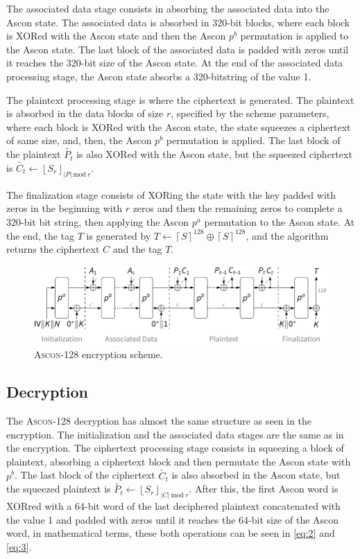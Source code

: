 \documentclass[11pt,twoside]{article}
\begin{document}
The associated data stage consists in absorbing the associated data into the Ascon state. The associated data is absorbed in 320-bit blocks, where each block is XORed with the Ascon state and then the Ascon $p^b$ permutation is applied to the Ascon state. The last block of the associated data is padded with zeros until it reaches the 320-bit size of the Ascon state. At the end of the associated data processing stage, the Ascon state absorbs a 320-bitstring of the value 1.

The plaintext processing stage is where the ciphertext is generated. The plaintext is absorbed in the data blocks of size $r$, specified by the scheme parameters, where each block is XORed with the Ascon state, the state squeezes a ciphertext of same size, and, then, the Ascon $p^b$ permutation is applied. The last block of the plaintext $\tilde{P_t}$ is also XORed with the Ascon
state, but the squeezed ciphertext is $\tilde{C_t} \leftarrow {\left \lfloor  S_r \right \rfloor}_{|P| \ \textrm{mod} \ r}$.

The finalization stage consists of XORing the state with the key padded with zeros in the beginning with $r$ zeros and then the remaining zeros to complete a 320-bit bit string, then applying the Ascon $p^a$ permutation to the Ascon state. At the end, the tag $T$ is generated by $T \leftarrow {\left \lceil  S \right \rceil}^{128} \oplus  {\left \lceil  S \right \rceil}^{128}$, and the algorithm returns the ciphertext $C$ and the tag $T$.

\begin{figure}[h]
  \centering
  \includegraphics[scale=0.8]{assets/aead_encrypt.pdf}
  \caption{\textsc{Ascon-128} encryption scheme.}
  \label{fig:ascon128encrypt}
\end{figure}

\subsection{Decryption}

The \textsc{Ascon-128} decryption has almost the same structure as seen in the encryption. The initialization and the associated data stages are the same as in the encryption. The ciphertext processing stage consists in squeezing  a block of plaintext, absorbing a ciphertext block and then permutate the Ascon state with $p^b$. The last block of the ciphertext $\tilde{C_t}$ is also absorbed in the Ascon state, but the squeezed plaintext is $\tilde{P_t} \leftarrow {\left \lfloor  S_r \right \rfloor}_{|C| \ \textrm{mod} \ r}$. After this, the first Ascon word is XORred with a 64-bit word of the last deciphered plaintext concatenated with the value 1 and padded with zeros until it reaches the 64-bit size of the Ascon word, in mathematical terms, these both operations can be seen in \cref{eq:2} and \cref{eq:3}.
\end{document}
